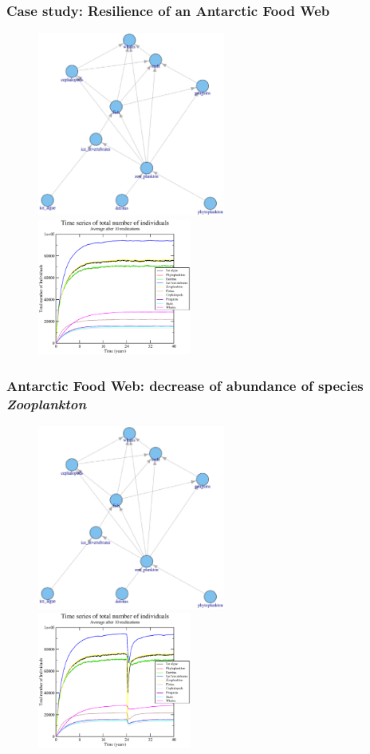 \documentclass[xcolor=x11names,compress]{beamer}
\renewcommand{\(}{\begin{columns}}
\renewcommand{\)}{\end{columns}}
\newcommand{\<}[1]{\begin{column}{#1}}
\renewcommand{\>}{\end{column}}
\begin{document}
\begin{frame}
\frametitle{Case study: Resilience of an Antarctic Food Web}
\begin{figure}
 \includegraphics[width=0.55\textwidth]{./figures/Antarctic_fweb.eps} 
 \includegraphics[width=0.45\textwidth]{./figures/ant_control.eps}
\end{figure}
\end{frame}

\begin{frame}
\frametitle{Antarctic Food Web: decrease of abundance of species \emph{Zooplankton}}
\begin{figure}
 \includegraphics[width=0.55\textwidth]{./figures/Antarctic_fweb.eps} 
 \includegraphics[width=0.45\textwidth]{./figures/ant_dec05.eps} 
\end{figure}
\end{frame}
\end{document}
